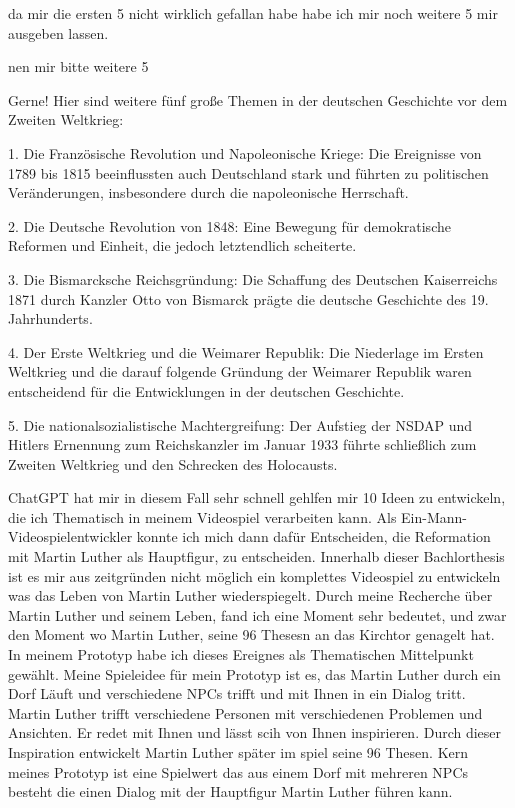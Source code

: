 \documentclass[12pt,a4paper,bibliography=totocnumbered,listof=totocnumbered]{scrartcl}
\begin{document}
da mir die ersten 5 nicht wirklich gefallan habe habe ich mir noch weitere 5 mir ausgeben lassen.

nen mir bitte weitere 5

Gerne! Hier sind weitere fünf große Themen in der deutschen Geschichte vor dem Zweiten Weltkrieg:

1. Die Französische Revolution und Napoleonische Kriege: Die Ereignisse von 1789 bis 1815 beeinflussten auch Deutschland stark und führten zu politischen Veränderungen, insbesondere durch die napoleonische Herrschaft.

2. Die Deutsche Revolution von 1848: Eine Bewegung für demokratische Reformen und Einheit, die jedoch letztendlich scheiterte.

3. Die Bismarcksche Reichsgründung: Die Schaffung des Deutschen Kaiserreichs 1871 durch Kanzler Otto von Bismarck prägte die deutsche Geschichte des 19. Jahrhunderts.

4. Der Erste Weltkrieg und die Weimarer Republik: Die Niederlage im Ersten Weltkrieg und die darauf folgende Gründung der Weimarer Republik waren entscheidend für die Entwicklungen in der deutschen Geschichte.

5. Die nationalsozialistische Machtergreifung: Der Aufstieg der NSDAP und Hitlers Ernennung zum Reichskanzler im Januar 1933 führte schließlich zum Zweiten Weltkrieg und den Schrecken des Holocausts.

ChatGPT hat mir in diesem Fall sehr schnell gehlfen mir 10 Ideen zu entwickeln, die ich Thematisch in meinem Videospiel verarbeiten kann. Als Ein-Mann-Videospielentwickler konnte ich mich dann dafür Entscheiden, die Reformation mit Martin Luther als Hauptfigur, zu entscheiden.
Innerhalb dieser Bachlorthesis ist es mir aus zeitgründen nicht möglich ein komplettes Videospiel zu entwickeln was das Leben von Martin Luther wiederspiegelt. Durch meine Recherche über Martin Luther und seinem Leben, fand ich eine Moment sehr bedeutet, und zwar den Moment wo Martin Luther, seine 96 Thesesn an das Kirchtor genagelt hat.
In meinem Prototyp habe ich dieses Ereignes als Thematischen Mittelpunkt gewählt.
Meine Spieleidee für mein Prototyp ist es, das Martin Luther durch ein Dorf Läuft und verschiedene NPCs trifft und mit Ihnen in ein Dialog tritt. Martin Luther trifft verschiedene Personen mit verschiedenen Problemen und Ansichten. Er redet mit Ihnen und lässt scih von Ihnen inspirieren. Durch dieser Inspiration entwickelt Martin Luther später im spiel seine 96 Thesen.
Kern meines Prototyp ist eine Spielwert das aus einem Dorf mit mehreren NPCs besteht die einen Dialog mit der Hauptfigur Martin Luther führen kann.
\end{document}
